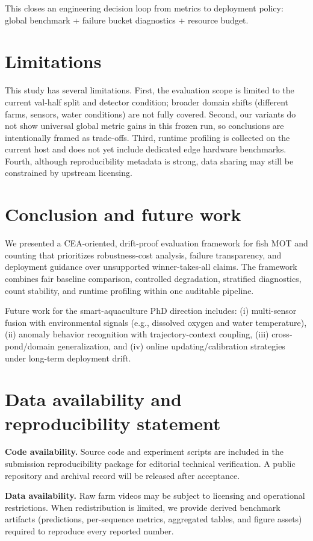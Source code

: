 \documentclass[preprint,12pt]{elsarticle}
\begin{document}
This closes an engineering decision loop from metrics to deployment policy: global benchmark + failure bucket diagnostics + resource budget.

\section{Limitations}
This study has several limitations. First, the evaluation scope is limited to the current val-half split and detector condition; broader domain shifts (different farms, sensors, water conditions) are not fully covered. Second, our variants do not show universal global metric gains in this frozen run, so conclusions are intentionally framed as trade-offs. Third, runtime profiling is collected on the current host and does not yet include dedicated edge hardware benchmarks. Fourth, although reproducibility metadata is strong, data sharing may still be constrained by upstream licensing.

\section{Conclusion and future work}
We presented a CEA-oriented, drift-proof evaluation framework for fish MOT and counting that prioritizes robustness-cost analysis, failure transparency, and deployment guidance over unsupported winner-takes-all claims. The framework combines fair baseline comparison, controlled degradation, stratified diagnostics, count stability, and runtime profiling within one auditable pipeline.

Future work for the smart-aquaculture PhD direction includes: (i) multi-sensor fusion with environmental signals (e.g., dissolved oxygen and water temperature), (ii) anomaly behavior recognition with trajectory-context coupling, (iii) cross-pond/domain generalization, and (iv) online updating/calibration strategies under long-term deployment drift.

\section{Data availability and reproducibility statement}
\textbf{Code availability.} Source code and experiment scripts are included in the submission reproducibility package for editorial technical verification. A public repository and archival record will be released after acceptance.

\textbf{Data availability.} Raw farm videos may be subject to licensing and operational restrictions. When redistribution is limited, we provide derived benchmark artifacts (predictions, per-sequence metrics, aggregated tables, and figure assets) required to reproduce every reported number.
\end{document}
